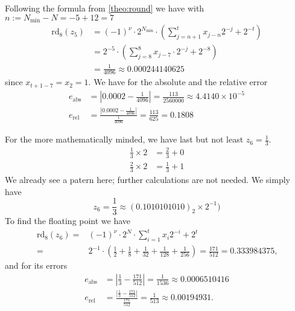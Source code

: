 \begin{exmp}
\begin{equation*}
    \end{equation*}
    Following the formula from \ref{theo:round} we have with \(n := N_{\text{min}} - N = -5 + 12 = 7\)
    \begin{align*}
        \text{rd}_8(z_5) &= (-1)^{\nu} \cdot 2^{N_\text{min}} \cdot \left( \sum_{j = n + 1}^{t} x_{j-n}2^{-j} + 2^{-t} \right) \\
        &= 2^{-5} \cdot \left(\sum_{j = 8}^8 x_{j-7} \cdot 2^{-j} + 2^{-8} \right) \\
        &= \frac{1}{4096} \approx 0.000244140625
    \end{align*}
    since \(x_{t + 1 - 7} = x_2 = 1\).
    We have for the absolute and the relative error
    \begin{align*}
        e_{\text{abs}} &= \left| 0.0002 - \frac{1}{4096} \right| = \frac{113}{2560000} \approx 4.4140 \times 10^{-5} \\
        e_{\text{rel}} &= \frac{\left| 0.0002 - \frac{1}{4096} \right|}{\frac{1}{4096}} = \frac{113}{625} = 0.1808
    \end{align*}
\end{exmp}
\begin{exmp}
    For the more mathematically minded, we have last but not least \(z_6 = \frac{1}{3}\).
    \begin{align*}
        \frac{1}{3} \times 2 &= \frac{2}{3} + 0 \\
        \frac{2}{3} \times 2 &= \frac{1}{3} + 1
    \end{align*}
    We already see a patern here; further calculations are not needed. We simply have
    \begin{equation*}
        z_6 = \frac{1}{3} \approx (0.1010101010)_2 \times 2^{-1})
    \end{equation*}
    To find the floating point we have
    \begin{align*}
        \text{rd}_8(z_6) =& (-1)^{\nu} \cdot 2^N \cdot \sum_{i=1}^{t}x_i 2^{-i} + 2^t \\
        =& 2^{-1} \cdot \left(\frac{1}{2} + \frac{1}{8} + \frac{1}{32} + \frac{1}{128} + \frac{1}{256} \right) = \frac{171}{512} = 0.333984375 \text{,}
    \end{align*}
    and for its errors
    \begin{align*}
        e_{\text{abs}} &= \left| \frac{1}{3} - \frac{171}{512} \right| = \frac{1}{1536} \approx 0.0006510416 \\
        e_{\text{rel}} &= \frac{\left| \frac{1}{3} - \frac{171}{512} \right|}{\frac{171}{512}} = \frac{1}{513} \approx 0.00194931 \text{.}
    \end{align*}
\end{exmp}
